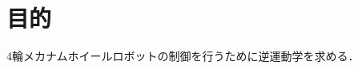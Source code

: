 \documentclass[../master]{subfiles}
\begin{document}
  \section{目的}

  4輪メカナムホイールロボットの制御を行うために逆運動学を求める．
\end{document}

